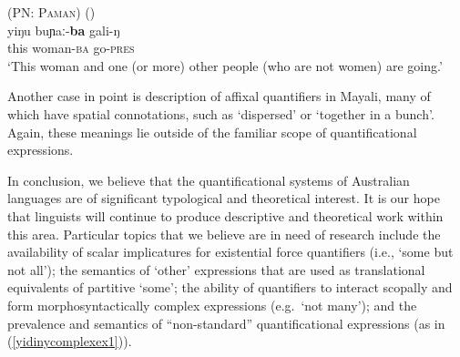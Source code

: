\documentclass[12pt,egregdoesnotlikesansseriftitles]{scrartcl}
\begin{document}

\begin{exe}
  \ex \textsc{ (PN: Paman)} \hfill (\citealt[146]{dixon77}) \label{yidinycomplexex1}\\
  \gll yiŋu buɲaː-\textbf{ba}  gali-ŋ\\
  this woman-\textsc{ba}  go-\textsc{pres} \\
  \glt `This woman and one (or more) other people (who are not women) are going.'
\end{exe}

Another case in point is  description of affixal quantifiers in Mayali, many of which have spatial connotations, such as `dispersed' or `together in a bunch'. Again, these meanings lie outside of the familiar scope of quantificational expressions.

In conclusion, we believe that the quantificational systems of Australian languages are of significant typological and theoretical interest. It is our hope that linguists will continue to produce descriptive and theoretical work within this area. Particular topics that we believe are in need of research include the availability of scalar implicatures for existential force quantifiers (i.e., `some but not all'); the semantics of `other' expressions that are used as translational equivalents of partitive `some'; the ability of quantifiers to interact scopally and form morphosyntactically complex expressions (e.g.\ `not many'); and the prevalence and semantics of ``non-standard'' quantificational expressions (as in (\ref{yidinycomplexex1})). 


\printbibliography
\end{document}
